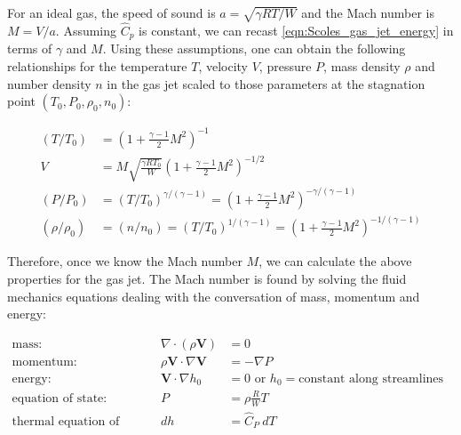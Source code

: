For an ideal gas, the speed of sound is $a = \sqrt{\gamma R T/W}$ and the Mach number is $M = V/a$. Assuming $\hat{C}_p$ is constant, we can recast \cref{eqn:Scoles_gas_jet_energy} in terms of $\gamma$ and $M$.  Using these assumptions, one can obtain the following relationships for the temperature $T$, velocity $V$, pressure $P$, mass density $\rho$ and number density $n$ in the gas jet scaled to those parameters at the stagnation point $(T_0, P_0, \rho_0, n_0)$:

\begin{subequations}
	\label{eqn:mach_properties}
	\begin{align}
	(T/T_0) &= \left(  1 + \frac{\gamma-1}{2} M^2 \right)^{-1} \label{eqn:gas_temp} \\
	V &= M \sqrt{ \frac{\gamma R T_0}{W} } \left( 1 + \frac{\gamma-1}{2} M^2 \right)^{-1/2} \label{eqn:gas_velo} \\
	(P/P_0) &= (T/T_0)^{\gamma/(\gamma-1)} = \left(  1 + \frac{\gamma-1}{2} M^2 \right)^{-\gamma/(\gamma-1)} \label{eqn:gas_pres} \\
	(\rho/\rho_0) &= (n/n_0) = (T/T_0)^{1/(\gamma-1)} = \left(  1 + \frac{\gamma-1}{2} M^2 \right)^{-1/(\gamma-1)} \label{eqn:gas_dens}
	\end{align}
\end{subequations}

Therefore, once we know the Mach number $M$, we can calculate the above properties for the gas jet. The Mach number is found by solving the fluid mechanics equations dealing with the conversation of mass, momentum and energy:

\begin{subequations}
	\label{eqn:scoles_continuum}
	\begin{flalign}
	\text{mass:} && \nabla \cdot (\rho \mathbf{V}) &= 0 && \label{eqn:scoles_mass} \\
	\text{momentum:} && \rho \mathbf{V} \cdot \nabla \mathbf{V} &= - \nabla P  && \label{eqn:scoles_momentum} \\
	\text{energy:} && \mathbf{V} \cdot \nabla h_0 &= 0 \textrm{ or } h_0 = \textrm{constant along streamlines} \label{eqn:scoles_energy} && \\
	\text{equation of state:} && P &= \rho \frac{R}{W} T  && \label{eqn:scoles_eqn-state} \\
	\text{thermal equation of state:} && dh &= \hat{C}_P \ dT \label{eqn:scoles_thermal-eqn-state} && 
	\end{flalign}
\end{subequations}

